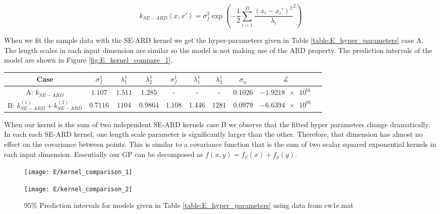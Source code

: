 \documentclass[11pt]{article}
\newcommand{\Lik}{\mathcal{L}}
\begin{document}
\begin{equation}
    k_{SE-ARD}(x, x') = \sigma_f^2 \exp(-\frac{1}{2}\sum_{i=1}^{D} \frac{(x_i - x_i')^2}{\lambda_i}^2)
    \label{eq:SEARD}
\end{equation}

When we fit the sample data with the SE-ARD kernel we get the hyper-parameters given in Table \ref{table:E_hyper_parameters} case A. The length scales in each input dimension are similar so the model is not making use of the ARD property. The prediction intervals of the model are shown in Figure \ref{fig:E_kernel_compare_1}. 

\begin{table*}[h]
    \centering
    \small
    \begin{tabular}{|c|c|c|c|c|c|c|c|c|c|}
        \hline
        Case & $\sigma_f^1$ & $\lambda_1^1$ & $\lambda_2^1$ & $\sigma_f^1$ & $\lambda_1^1$ & $\lambda_2^1$ & $\sigma_n$ & $\Lik$ \\
        \hline
        A: $k_{SE-ARD}$ & $1.107$ & $1.511$ & $1.285$ & - & - & - & $0.1026$ & $\num{-1.9218e+01}$ \\ 
        B: $k_{SE-ARD}^{(1)} + k_{SE-ARD}^{(2)}$ & $0.7116$ & $1104$ & $0.9864$ & $1.108$ & $1.446$ & $1281$ & $0.0979$ & $\num{-6.6394e+01}$ \\
        \hline
    \end{tabular}
    \caption{Hyper-parameter values for periodic SE covariance function}
    \label{table:E_hyper_parameters}
\end{table*}

When our kernel is the sum of two independent SE-ARD kernels case B we observe that the fitted hyper parameters change dramatically. In each each SE-ARD kernel, one length scale parameter is significantly larger than the other. Therefore, that dimension has almost no effect on the covariance between points. This is similar to a covariance function that is the sum of two scalar squared exponential kernels in each input dimension. Essentially our GP can be decomposed as $f(x,y) = f_x(x) + f_y(y)$. 

\begin{figure}[h]
    \centering
    \begin{minipage}{0.45\textwidth}
        \centering
        \texttt{[image: E/kernel\_comparison\_1]} 
        \label{fig:E_kernel_compare_1}
    \end{minipage}
    \begin{minipage}{0.45\textwidth}
        \centering
        \texttt{[image: E/kernel\_comparison\_2]} 
        \label{fig:E_kernel_compare_2}
    \end{minipage}
    \caption{95\% Prediction intervals for models given in Table \ref{table:E_hyper_parameters} using data from cw1e.mat}
    \label{fig:E_kernel_compare}
\end{figure}
\end{document}
